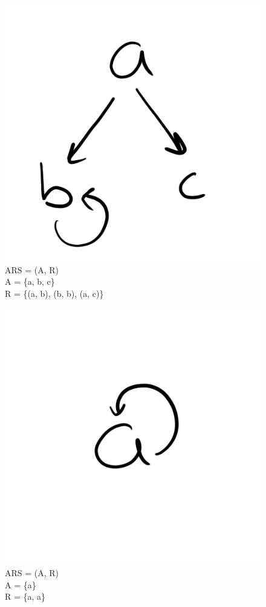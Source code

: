\documentclass{article}
\begin{document}
{\begin{figure}[h!]
  \centering
  \includegraphics[scale=0.06]{gen7}
  \caption[] {
     ARS = (A, R) \\ A = \{a, b, c\} \\ R = \{(a, b), (b, b), (a, c)\}
    \endtabular}
\end{figure}

\begin{figure}[h!]
  \centering
  \includegraphics[scale=0.06]{gen8}
  \caption[] {
     ARS = (A, R) \\ A = \{a\} \\ R = \{a, a\}
    \endtabular}
\end{figure}

}
\end{document}
